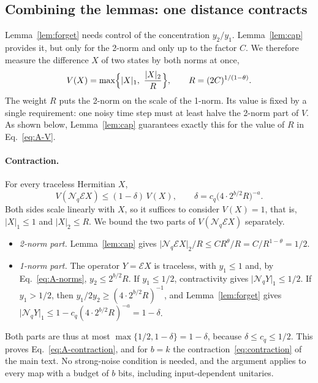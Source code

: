 \documentclass[aps,pra,reprint,superscriptaddress,floatfix]{revtex4-2}
\theoremstyle{plain}
\newcommand{\nrm}[2]{\lvert #1\rvert_{#2}}
\newcommand{\cE}{\mathcal E}
\newcommand{\Nq}{\mathcal N_q}
\begin{document}
\subsection{Combining the lemmas: one distance contracts}
\label{app:contract}

Lemma~\ref{lem:forget} needs control of the concentration $y_2/y_1$. Lemma~\ref{lem:cap} provides it, but only for the 2-norm and only up to the factor $C$. We therefore measure the difference $X$ of two states by both norms at once,
\begin{equation}
V(X)=\max\Bigl\{\nrm X1,\ \frac{\nrm X2}{R}\Bigr\},\qquad R=(2C)^{1/(1-\theta)} .
\label{eq:A-V}
\end{equation}
The weight $R$ puts the 2-norm on the scale of the 1-norm. Its value is fixed by a single requirement: one noisy time step must at least halve the 2-norm part of $V$. As shown below, Lemma~\ref{lem:cap} guarantees exactly this for the value of $R$ in Eq.~\eqref{eq:A-V}.

\paragraph*{Contraction.} For every traceless Hermitian $X$,
\begin{equation}
V(\Nq\cE X)\le(1-\delta)\,V(X),\qquad\delta=c_q\bigl(4\cdot2^{b/2}R\bigr)^{-a}.
\label{eq:A-contraction}
\end{equation}
Both sides scale linearly with $X$, so it suffices to consider $V(X)=1$, that is, $\nrm X1\le1$ and $\nrm X2\le R$. We bound the two parts of $V(\Nq\cE X)$ separately.
\begin{itemize}
\item \emph{2-norm part.} Lemma~\ref{lem:cap} gives $\nrm{\Nq\cE X}2/R\le CR^{\theta}/R=C/R^{1-\theta}=1/2$.
\item \emph{1-norm part.} The operator $Y=\cE X$ is traceless, with $y_1\le1$ and, by Eq.~\eqref{eq:A-norms}, $y_2\le2^{b/2}R$. If $y_1\le1/2$, contractivity gives $\nrm{\Nq Y}1\le1/2$. If $y_1>1/2$, then $y_1/2y_2\ge(4\cdot2^{b/2}R)^{-1}$, and Lemma~\ref{lem:forget} gives $\nrm{\Nq Y}1\le1-c_q(4\cdot2^{b/2}R)^{-a}=1-\delta$.
\end{itemize}
Both parts are thus at most $\max\{1/2,1-\delta\}=1-\delta$, because $\delta\le c_q\le1/2$. This proves Eq.~\eqref{eq:A-contraction}, and for $b=k$ the contraction~\eqref{eq:contraction} of the main text. No strong-noise condition is needed, and the argument applies to every map with a budget of $b$ bits, including input-dependent unitaries.
\end{document}

